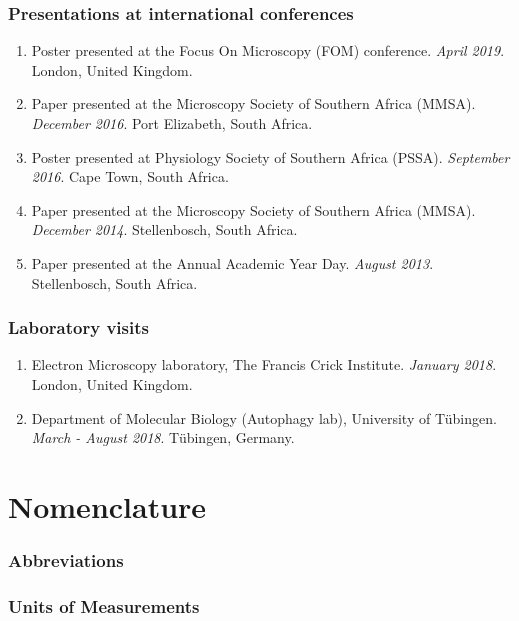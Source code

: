 \subsection*{Presentations at international conferences}
\begin{enumerate}
\item Poster presented at the Focus On Microscopy (FOM) conference. \textit{April 2019}. London, United Kingdom.
\item Paper presented at the Microscopy Society of Southern Africa (MMSA). \textit{December 2016}. Port Elizabeth, South Africa.
\item Poster presented at Physiology Society of Southern Africa (PSSA). \textit{September 2016}. Cape Town, South Africa.
\item Paper presented at the Microscopy Society of Southern Africa (MMSA). \textit{December 2014}. Stellenbosch, South Africa.
\item Paper presented at the Annual Academic Year Day. \textit{August 2013}. Stellenbosch, South Africa.
\end{enumerate}

\subsection*{Laboratory visits}
\begin{enumerate}
\item Electron Microscopy laboratory, The Francis Crick Institute. \textit{January 2018}. London, United Kingdom.
\item Department of Molecular Biology (Autophagy lab), University of T{\"u}bingen. \textit{March - August 2018}. T{\"u}bingen, Germany.
\end{enumerate}
\newpage

\setcounter{secnumdepth}{4}
\setcounter{tocdepth}{4}

\tableofcontents
\newpage

\listoffigures
\newpage

\listoftables
\newpage

\chapter*{Nomenclature}
\subsection*{Abbreviations}
\begin{itemize}[leftmargin=*,wide=0pt,]
   {\item[] \textbf{\thisAcronym} \thisDesc}
\end{itemize}

\subsection*{Units of Measurements}
\begin{itemize}[leftmargin=*,wide=0pt,]
   {\item[] \textbf{\thisUnit} \thisDesc}
\end{itemize}
